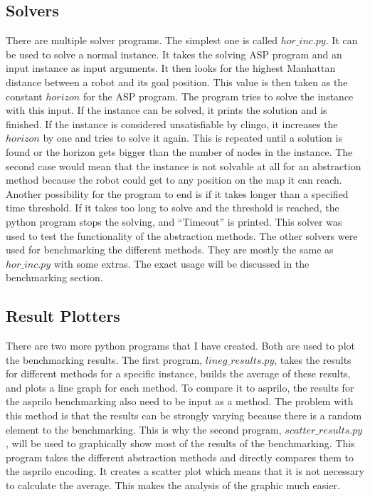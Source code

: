\documentclass[runningheads]{llncs}
\begin{document}
\subsection{Solvers}
There are multiple solver programs. The simplest one is called $hor\_inc.py$. It can be used to solve a normal instance. It takes the solving ASP program and an input instance as input arguments. It then looks for the highest Manhattan distance between a robot and its goal position. This value is then taken as the constant $horizon$ for the ASP program. The program tries to solve the instance with this input. If the instance can be solved, it prints the solution and is finished. If the instance is considered unsatisfiable by clingo, it increases the $horizon$ by one and tries to solve it again. This is repeated until a solution is found or the horizon gets bigger than the number of nodes in the instance. The second case would mean that the instance is not solvable at all for an abstraction method because the robot could get to any position on the map it can reach. Another possibility for the program to end is if it takes longer than a specified time threshold. If it takes too long to solve and the threshold is reached, the python program stops the solving, and ``Timeout'' is printed. This solver was used to test the functionality of the abstraction methods. The other solvers were used for benchmarking the different methods. They are mostly the same as $hor\_inc.py$ with some extras. The exact usage will be discussed in the benchmarking section.
\subsection{Result Plotters}
There are two more python programs that I have created. Both are used to plot the benchmarking results. The first program, $lineg\_results.py$, takes the results for different methods for a specific instance, builds the average of these results, and plots a line graph for each method. To compare it to asprilo, the results for the asprilo benchmarking also need to be input as a method. The problem with this method is that the results can be strongly varying because there is a random element to the benchmarking. This is why the second program, $scatter\_results.py$, will be used to graphically show most of the results of the benchmarking. This program takes the different abstraction methods and directly compares them to the asprilo encoding. It creates a scatter plot which means that it is not necessary to calculate the average. This makes the analysis of the graphic much easier.  
\end{document}
